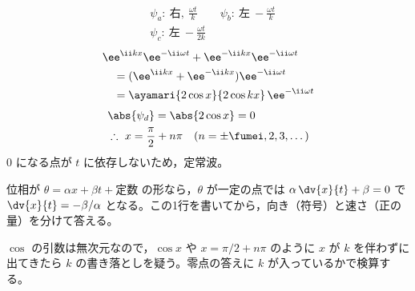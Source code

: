 \begin{align*}
&\psi_{a}:\ \text{右},\ \frac{\omega t}{k}\qquad\psi_{b}:\ \text{左}\ -\frac{\omega t}{k}\\
&\psi_{c}:\ \text{左}\ -\frac{\omega t}{2k}
\end{align*}
\begin{align*}
&\ee^{\ii kx}\ee^{-\ii\omega t}+\ee^{-\ii kx}\ee^{-\ii\omega t}\\
&\quad=(\ee^{\ii kx}+\ee^{-\ii kx})\ee^{-\ii\omega t}\\
&\quad=\ayamari{2\cos x}{2\cos kx}\,\ee^{-\ii\omega t}
\end{align*}
\begin{align*}
&\abs{\psi_{d}}=\abs{2\cos x}=0\\
&\therefore\ x=\frac{\pi}{2}+n\pi\quad(n=\pm\fumei,2,3,\dots)
\end{align*}
$0$ になる点が $t$ に依存しないため，定常波。
\item 位相が $\theta=\alpha x+\beta t+\text{定数}$ の形なら，$\theta$ が一定の点では $\alpha\,\dv{x}{t}+\beta=0$ で $\dv{x}{t}=-\beta/\alpha$ となる。この1行を書いてから，向き（符号）と速さ（正の量）を分けて答える。
\item $\cos$ の引数は無次元なので，$\cos x$ や $x=\pi/2+n\pi$ のように $x$ が $k$ を伴わずに出てきたら $k$ の書き落としを疑う。零点の答えに $k$ が入っているかで検算する。
